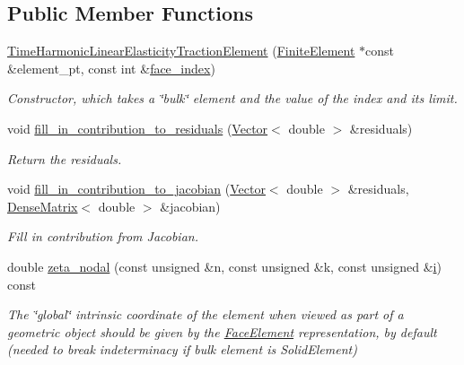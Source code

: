 \subsection*{Public Member Functions}
\begin{DoxyCompactItemize}
\item 
\hyperlink{classoomph_1_1TimeHarmonicLinearElasticityTractionElement_a3ee0f8496945991a8937207ab246602a}{Time\+Harmonic\+Linear\+Elasticity\+Traction\+Element} (\hyperlink{classoomph_1_1FiniteElement}{Finite\+Element} $\ast$const \&element\+\_\+pt, const int \&\hyperlink{classoomph_1_1FaceElement_a478d577ac6db67ecc80f1f02ae3ab170}{face\+\_\+index})
\begin{DoxyCompactList}\small\item\em Constructor, which takes a \char`\"{}bulk\char`\"{} element and the value of the index and its limit. \end{DoxyCompactList}\item 
void \hyperlink{classoomph_1_1TimeHarmonicLinearElasticityTractionElement_ae60d3751c907bf53772f02d18e187496}{fill\+\_\+in\+\_\+contribution\+\_\+to\+\_\+residuals} (\hyperlink{classoomph_1_1Vector}{Vector}$<$ double $>$ \&residuals)
\begin{DoxyCompactList}\small\item\em Return the residuals. \end{DoxyCompactList}\item 
void \hyperlink{classoomph_1_1TimeHarmonicLinearElasticityTractionElement_abe56c5d06398dd108308b8105cb24de9}{fill\+\_\+in\+\_\+contribution\+\_\+to\+\_\+jacobian} (\hyperlink{classoomph_1_1Vector}{Vector}$<$ double $>$ \&residuals, \hyperlink{classoomph_1_1DenseMatrix}{Dense\+Matrix}$<$ double $>$ \&jacobian)
\begin{DoxyCompactList}\small\item\em Fill in contribution from Jacobian. \end{DoxyCompactList}\item 
double \hyperlink{classoomph_1_1TimeHarmonicLinearElasticityTractionElement_a6477822c4cd242cccaacaea672155b8f}{zeta\+\_\+nodal} (const unsigned \&n, const unsigned \&k, const unsigned \&\hyperlink{cfortran_8h_adb50e893b86b3e55e751a42eab3cba82}{i}) const
\begin{DoxyCompactList}\small\item\em The \char`\"{}global\char`\"{} intrinsic coordinate of the element when viewed as part of a geometric object should be given by the \hyperlink{classoomph_1_1FaceElement}{Face\+Element} representation, by default (needed to break indeterminacy if bulk element is Solid\+Element) \end{DoxyCompactList}\item 

\end{DoxyCompactItemize}
